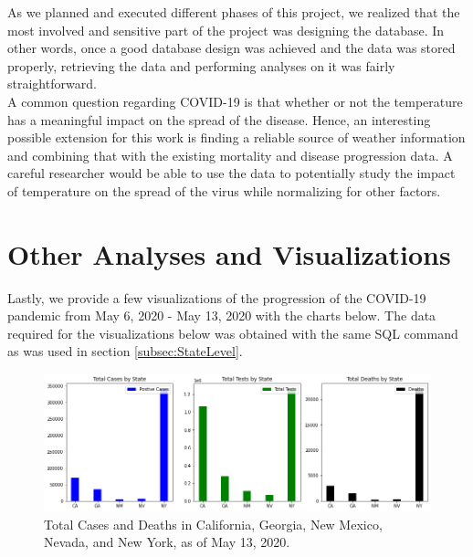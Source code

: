 \documentclass[11pt]{article}
\begin{document}
\noindent
As we planned and executed different phases of this project, we realized that the most involved and sensitive part of the project was designing the database. In other words, once a good database design was achieved and the data was stored properly, retrieving the data and performing analyses on it was fairly straightforward.\\

\noindent
 A common question regarding COVID-19 is that whether or not the temperature has a meaningful impact on the spread of the disease. Hence, an interesting possible extension for this work is finding a reliable source of weather information and combining that with the existing mortality and disease progression data. A careful researcher would be able to use the data to potentially study the impact of temperature on the spread of the virus while normalizing for other factors.

\pagebreak




\pagebreak

\appendix

\section{Other Analyses and Visualizations}

\noindent
Lastly, we provide a few visualizations of the progression of the COVID-19 pandemic from May 6, 2020 - May 13, 2020 with the charts below. The data required for the visualizations below was obtained with the same SQL command as was used in section \ref{subsec:StateLevel}.

\FloatBarrier
\begin{figure}[h]
    \centering
    \includegraphics[width=\linewidth]{diagrams/analysis/total_cases_bar.png}
    \caption{Total Cases and Deaths in California, Georgia, New Mexico, Nevada, and New York, as of May 13, 2020.}
    \label{fig:overall}
\end{figure}
\FloatBarrier
\end{document}
